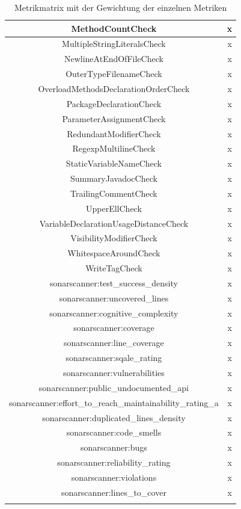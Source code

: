 \documentclass[
	oneside,  %
	ngerman, 
	final, 
	11pt, 
	a4paper, 
	1.1headlines, 
	headinclude=false, 
	footinclude=false, 
	mpinclude=false, 
	pagesize, 
	onecolumn, 
	titlepage, 
	parskip=half, 
	headsepline, 
	chapterprefix=false, 
	version=first, 
	listof=totoc, 
	bibliography=totoc, 
	toc=graduated, 
	fleqn
]{scrbook}
\begin{document}
\begin{longtable}{|c|c|}
	MethodCountCheck & x \\ \hline
	MultipleStringLiteralsCheck & x \\ \hline
	NewlineAtEndOfFileCheck & x \\ \hline
	OuterTypeFilenameCheck & x \\ \hline
	OverloadMethodsDeclarationOrderCheck & x \\ \hline
	PackageDeclarationCheck & x \\ \hline
	ParameterAssignmentCheck & x \\ \hline
	RedundantModifierCheck & x \\ \hline
	RegexpMultilineCheck & x \\ \hline
	StaticVariableNameCheck & x \\ \hline
	SummaryJavadocCheck & x \\ \hline
	TrailingCommentCheck & x \\ \hline
	UpperEllCheck & x \\ \hline
	VariableDeclarationUsageDistanceCheck & x \\ \hline
	VisibilityModifierCheck & x \\ \hline
	WhitespaceAroundCheck & x \\ \hline
	WriteTagCheck & x \\ \hline
	sonarscanner:test\_success\_density & x \\ \hline
	sonarscanner:uncovered\_lines & x \\ \hline
	sonarscanner:cognitive\_complexity & x \\ \hline
	sonarscanner:coverage & x \\ \hline
	sonarscanner:line\_coverage & x \\ \hline
	sonarscanner:sqale\_rating & x \\ \hline
	sonarscanner:vulnerabilities & x \\ \hline
	sonarscanner:public\_undocumented\_api & x \\ \hline
	sonarscanner:effort\_to\_reach\_maintainability\_rating\_a & x \\ \hline
	sonarscanner:duplicated\_lines\_density & x \\ \hline
	sonarscanner:code\_smells & x \\ \hline
	sonarscanner:bugs & x \\ \hline
	sonarscanner:reliability\_rating & x \\ \hline
	sonarscanner:violations & x \\ \hline
	sonarscanner:lines\_to\_cover & x \\ \hline
	\caption{Metrikmatrix mit der Gewichtung der einzelnen Metriken}
\end{longtable}
\end{document}
